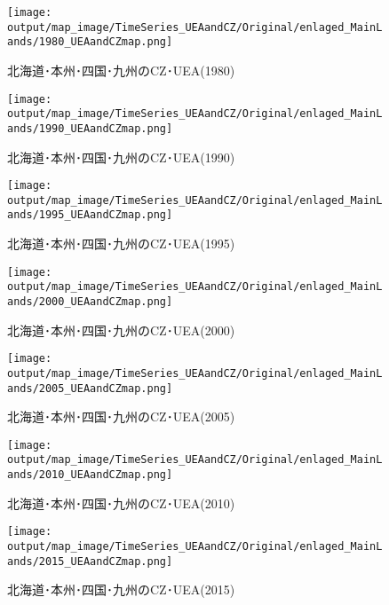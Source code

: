 \documentclass{ltjsarticle}
\begin{document}
\begin{figure}[pbth]
  \centering
  \texttt{[image: output/map\_image/TimeSeries\_UEAandCZ/Original/enlaged\_MainLands/1980\_UEAandCZmap.png]}
  \caption{\label{ori:tsM1980}北海道･本州･四国･九州のCZ･UEA(1980)}
\end{figure}

\begin{figure}[pbth]
  \centering
  \texttt{[image: output/map\_image/TimeSeries\_UEAandCZ/Original/enlaged\_MainLands/1990\_UEAandCZmap.png]}
  \caption{\label{ori:tsM1990}北海道･本州･四国･九州のCZ･UEA(1990)}
\end{figure}

\begin{figure}[pbth]
  \centering
  \texttt{[image: output/map\_image/TimeSeries\_UEAandCZ/Original/enlaged\_MainLands/1995\_UEAandCZmap.png]}
  \caption{\label{ori:tsM1995}北海道･本州･四国･九州のCZ･UEA(1995)}
\end{figure}

\begin{figure}[pbth]
  \centering
  \texttt{[image: output/map\_image/TimeSeries\_UEAandCZ/Original/enlaged\_MainLands/2000\_UEAandCZmap.png]}
  \caption{\label{ori:tsM2000}北海道･本州･四国･九州のCZ･UEA(2000)}
\end{figure}

\begin{figure}[pbth]
  \centering
  \texttt{[image: output/map\_image/TimeSeries\_UEAandCZ/Original/enlaged\_MainLands/2005\_UEAandCZmap.png]}
  \caption{\label{ori:tsM2005}北海道･本州･四国･九州のCZ･UEA(2005)}
\end{figure}

\begin{figure}[pbth]
  \centering
  \texttt{[image: output/map\_image/TimeSeries\_UEAandCZ/Original/enlaged\_MainLands/2010\_UEAandCZmap.png]}
  \caption{\label{ori:tsM2010}北海道･本州･四国･九州のCZ･UEA(2010)}
\end{figure}

\begin{figure}[pbth]
  \centering
  \texttt{[image: output/map\_image/TimeSeries\_UEAandCZ/Original/enlaged\_MainLands/2015\_UEAandCZmap.png]}
  \caption{\label{ori:tsM2015}北海道･本州･四国･九州のCZ･UEA(2015)}
\end{figure}
\end{document}
